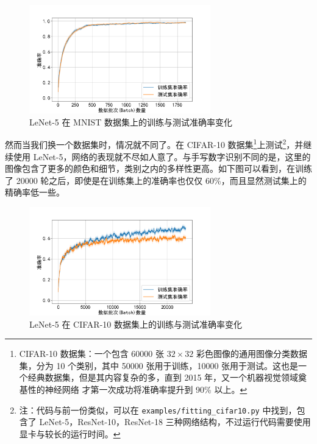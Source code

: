 \begin{figure}[H]
    \centering
    \includegraphics[width=0.7\textwidth]{img/lenet5_mnist.png}
    \caption{LeNet-5 在 MNIST 数据集上的训练与测试准确率变化}
    \label{fig:fitting-accuracy}
\end{figure}

然而当我们换一个数据集时，情况就不同了。在 CIFAR-10 数据集\footnote{CIFAR-10 数据集：一个包含 60000 张 $32 \times 32$ 彩色图像的通用图像分类数据集，分为 10 个类别，其中 50000 张用于训练，10000 张用于测试。这也是一个经典数据集，但是其内容复杂的多，直到 2015 年，又一个机器视觉领域奠基性的神经网络  才第一次成功将准确率提升到 90\% 以上。}上测试\footnote{注：代码与前一份类似，可以在 \texttt{examples/fitting\_cifar10.py} 中找到，包含了 LeNet-5，ResNet-10，ResNet-18 三种网络结构，不过运行代码需要使用显卡与较长的运行时间。}，并继续使用 LeNet-5，网络的表现就不尽如人意了。与手写数字识别不同的是，这里的图像包含了更多的颜色和细节，类别之内的多样性更高。如下图可以看到，在训练了 20000 轮之后，即使是在训练集上的准确率也仅仅 60\%，而且显然测试集上的精确率低一些。

\begin{figure}[H]
    \centering
    \includegraphics[width=0.7\textwidth]{img/lenet5_cifar10.png}
    \caption{LeNet-5 在 CIFAR-10 数据集上的训练与测试准确率变化}
    \label{fig:lenet5-cifar10-accuracy}
\end{figure}

